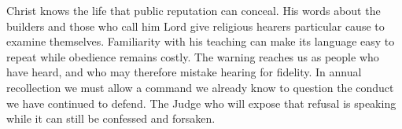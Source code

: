 Christ knows the life that public reputation can conceal. His words about the builders and those who call him Lord give religious hearers particular cause to examine themselves. Familiarity with his teaching can make its language easy to repeat while obedience remains costly. The warning reaches us as people who have heard, and who may therefore mistake hearing for fidelity. In annual recollection we must allow a command we already know to question the conduct we have continued to defend. The Judge who will expose that refusal is speaking while it can still be confessed and forsaken.

